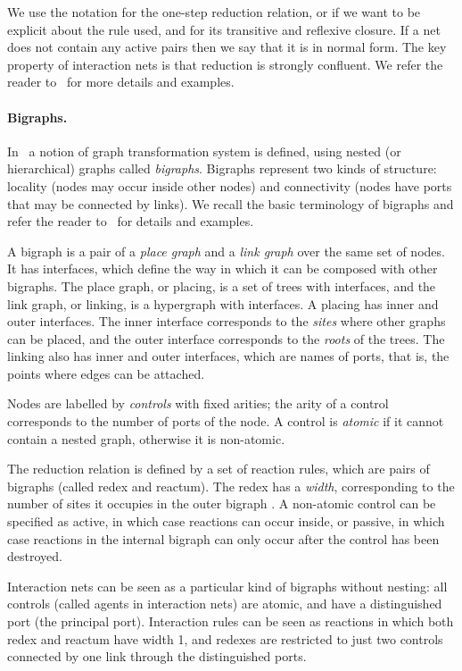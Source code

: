 \documentclass[copyright,creativecommons]{eptcs}
\begin{document}
We use the notation  for the one-step reduction relation, or
 if we want to be explicit about the
rule used, and  for its transitive and reflexive closure. If a
net does not contain any active pairs then we say that it is in normal
form. The key property of interaction nets is that reduction is
strongly confluent.  We refer the reader to~\cite{LafontY:intn} for
more details and examples.

\paragraph{Bigraphs.}
In~\cite{Milner,jensen03bigraphs} a notion of graph transformation
system is defined, using nested (or hierarchical) graphs called
\emph{bigraphs}.  Bigraphs represent two kinds of structure: locality
(nodes may occur inside other nodes) and connectivity (nodes have
ports that may be connected by links). We recall the basic terminology
of bigraphs and refer the reader to~\cite{Milner} for details and
examples.

A bigraph is a pair of a \emph{place graph} and a \emph{link graph}
over the same set of nodes. 
It has interfaces, which define the way in which it can be composed
with other bigraphs. The place graph, or placing, is a set of trees
with interfaces, and the link graph, or linking, is a hypergraph with
interfaces. A placing has inner and outer interfaces. The inner
interface corresponds to the \emph{sites} where other graphs can be
placed, and the outer interface corresponds to the \emph{roots} of the
trees. The linking also has inner and outer interfaces, which are
names of ports, that is, the points where edges can be attached.

Nodes are labelled by \emph{controls} with fixed arities; the arity of
a control corresponds to the number of ports of the node.  A control
is \emph{atomic} if it cannot contain a nested graph, otherwise it is
non-atomic.


The reduction relation is defined by a set of reaction rules, which
are pairs of bigraphs (called redex and reactum). The redex has a
\emph{width}, corresponding to the number of sites it occupies in the
outer bigraph \cite{jensen03bigraphs}.  A non-atomic control  can
be specified as active, in which case reactions can occur inside, or
passive, in which case reactions in the internal bigraph can only
occur after the control  has been destroyed.

Interaction nets can be seen as a particular kind of bigraphs without
nesting: all controls (called agents in interaction nets) are atomic,
and have a distinguished port (the principal port). Interaction rules
can be seen as reactions in which both redex and reactum have width 1,
and redexes are restricted to just two controls connected by one link
through the distinguished ports.
\end{document}
